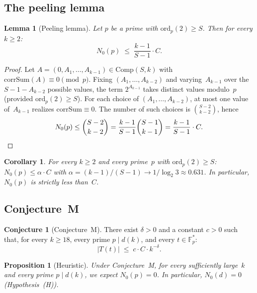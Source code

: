 \documentclass[12pt, a4paper]{amsart}
\theoremstyle{plain}
\newtheorem{proposition}[theorem]{Proposition}
\newtheorem{lemma}[theorem]{Lemma}
\newtheorem{corollary}[theorem]{Corollary}
\theoremstyle{definition}
\newtheorem{conjecture}[theorem]{Conjecture}
\theoremstyle{remark}
\newcommand{\Fp}{\mathbb{F}_p}
\newcommand{\Comp}{\mathrm{Comp}}
\newcommand{\corrSum}{\mathrm{corrSum}}
\newcommand{\ord}{\mathrm{ord}}
\begin{document}
\subsection{The peeling lemma}

\begin{lemma}[Peeling lemma]\label{lem:peeling}
  Let $p$ be a prime with $\ord_p(2) \geq S$.
  Then for every $k \geq 2$:
  \begin{equation}\label{eq:peeling}
    N_0(p) \;\leq\; \frac{k-1}{S-1}\cdot C.
  \end{equation}
\end{lemma}

\begin{proof}
  Let $A = (0, A_1, \ldots, A_{k-1}) \in \Comp(S,k)$ with
  $\corrSum(A) \equiv 0 \pmod{p}$. Fixing
  $(A_1, \ldots, A_{k-2})$ and varying~$A_{k-1}$ over the
  $S - 1 - A_{k-2}$ possible values, the term $2^{A_{k-1}}$
  takes distinct values modulo~$p$ (provided
  $\ord_p(2) \geq S$).
  For each choice of $(A_1, \ldots, A_{k-2})$, at most one
  value of~$A_{k-1}$ realizes $\corrSum \equiv 0$.
  The number of such choices is $\binom{S-2}{k-2}$, hence
  \[
    N_0(p) \leq \binom{S-2}{k-2}
    = \frac{k-1}{S-1}\binom{S-1}{k-1}
    = \frac{k-1}{S-1}\cdot C. \qedhere
  \]
\end{proof}

\begin{corollary}\label{cor:peeling}
  For every $k \geq 2$ and every prime~$p$ with
  $\ord_p(2) \geq S$:
  $N_0(p) \leq \alpha \cdot C$ with
  $\alpha = (k-1)/(S-1) \to 1/\log_2 3 \approx 0.631$.
  In particular, $N_0(p)$ is strictly less than~$C$.
\end{corollary}

\subsection{Conjecture~M}

\begin{conjecture}[Conjecture~M]\label{conj:M}
  There exist $\delta > 0$ and a constant $c > 0$ such that,
  for every $k \geq 18$, every prime $p \mid d(k)$, and
  every $t \in \Fp^*$:
  \begin{equation}\label{eq:conjecture-M}
    |T(t)| \;\leq\; c \cdot C \cdot k^{-\delta}.
  \end{equation}
\end{conjecture}

\begin{proposition}[Heuristic]\label{prop:M-implies-H}
  Under Conjecture~M, for every sufficiently large~$k$
  and every prime $p \mid d(k)$, we expect $N_0(p) = 0$.
  In particular, $N_0(d) = 0$ (Hypothesis~\textup{(H)}).
\end{proposition}
\end{document}
